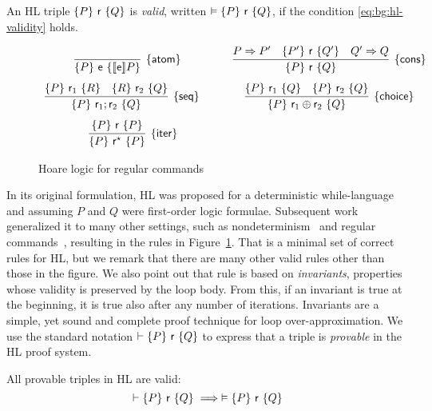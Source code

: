 \noindent
An HL triple $\{P\}~\mathsf{r}~\{Q\}$ is \emph{valid}, written $\vDash \{P\}~\mathsf{r}~\{Q\}$, if the condition \eqref{eq:bg:hl-validity} holds.

\begin{figure}[t]
	\centering
	\begin{framed}
		\(
		\begin{array}{cc}
			\infer[\hlrule{atom}]
			{\hltriple{P}{\expe}{\denot{\expe}P}}
			{}
			\quad                     &
			\infer[\hlrule{cons}]
			{\hltriple{P}{\regr}{Q}}
			{P \Rightarrow P'         & \hltriple{P'}{\regr}{Q'}  & Q' \Rightarrow Q}
			\\[7.5pt]
			\infer[\hlrule{seq}]
			{\hltriple{P}{\regr_1;\regr_2}{Q}}
			{\hltriple{P}{\regr_1}{R} & \hltriple{R}{\regr_2}{Q}}
			\qquad                    &
			\infer[\hlrule{choice}]
			{\hltriple{P}{\regr_1 \regplus \regr_2}{Q}}
			{\hltriple{P}{\regr_1}{Q} & \hltriple{P}{\regr_2}{Q}}
			\\[7.5pt]
			\infer[\hlrule{iter}]
			{\hltriple{P}{\regr^\kstar}{P}}
			{\hltriple{P}{\regr}{P}}
		\end{array}
		\)
	\end{framed}
	\vspace{-1ex}
	\caption{Hoare logic for regular commands}\label{fig:bg:hl}
\end{figure}

In its original formulation, HL was proposed for a deterministic while-language and assuming $P$ and $Q$ were first-order logic formulae.
Subsequent work generalized it to many other settings, such as nondeterminism~\cite{Apt84} and regular commands~\cite{MOH21}, resulting in the rules in Figure~\ref{fig:bg:hl}.
That is a minimal set of correct rules for HL, but we remark that there are many other valid rules other than those in the figure. We also point out that rule  is based on \emph{invariants}, properties whose validity is preserved by the loop body. From this, if an invariant is true at the beginning, it is true also after any number of iterations. Invariants are a simple, yet sound and complete proof technique for loop over-approximation.
We use the standard notation $\vdash \{P\}~\mathsf{r}~\{Q\}$ to express that a triple is \emph{provable} in the HL proof system.

\begin{theorem}
	All provable triples in HL are valid:
	\[
	\vdash \{P\}~\mathsf{r}~\{Q\} \implies \vDash \{P\}~\mathsf{r}~\{Q\}
	\]
\end{theorem}

